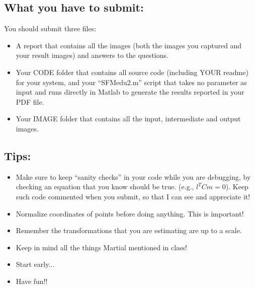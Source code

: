 \documentclass[11pt]{article}
\begin{document}


\subsection{What you have to submit:}
\label{sec:tosubmit}
You should submit three files:
\begin{itemize}
\item A report that contains all the images (both the images you captured and your result images) and answers to the questions.
\item Your CODE folder that contains all source code (including YOUR readme) for your system, and your ``SFMedu2.m'' script that takes no parameter as input and runs directly in Matlab to generate
the results reported in your PDF file.
\item Your IMAGE folder that contains all the input, intermediate and output images.
\end{itemize}


\subsection{Tips:}
\label{sec:helpercode}
\begin{itemize}
\item Make sure to keep ``sanity checks'' in your code while you are debugging, by checking an equation that you know should be true. (e.g., $l^TCm=0$). Keep such code commented when you submit, so that I can see and appreciate it!
\item Normalize coordinates of points before doing anything. This is important!
\item Remember the transformations that you are estimating are up to a scale.
\item Keep in mind all the things Martial mentioned in class!
\item Start early...
\item Have fun!!
\end{itemize}
\end{document}
